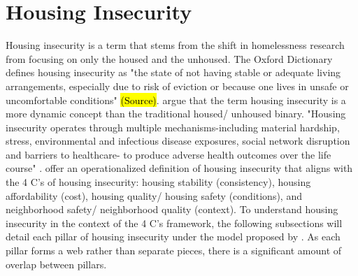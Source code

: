 \section{Housing Insecurity}

Housing insecurity is a term that stems from the shift in homelessness research from focusing on only the housed and the unhoused. The Oxford Dictionary defines housing insecurity as "the state of not having stable or adequate living arrangements, especially due to risk of eviction or because one lives in unsafe or uncomfortable conditions" \hl{(Source)}. \citep{deluca_housing_2022} argue that the term housing insecurity is a more dynamic concept than the traditional housed/ unhoused binary. "Housing insecurity operates through multiple mechanisms-including material hardship, stress, environmental and infectious disease exposures, social network disruption and barriers to healthcare- to produce adverse health outcomes over the life course" \citep{leifheit_building_2022}. \citet{cox_road_2019} offer an operationalized definition of housing insecurity that aligns with the 4 C's of housing insecurity: housing stability (consistency), housing affordability (cost), housing quality/ housing safety (conditions), and neighborhood safety/ neighborhood quality (context). To understand housing insecurity in the context of the 4 C's framework, the following subsections will detail each pillar of housing insecurity under the model proposed by \citep{hernandez_housing_2019}. As each pillar forms a web rather than separate pieces, there is a significant amount of overlap between pillars. 
 

